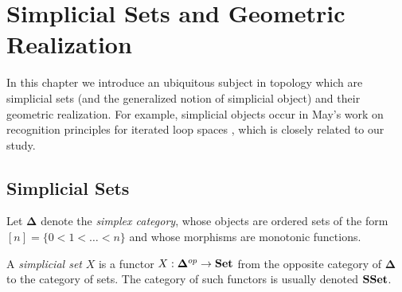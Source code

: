 \documentclass[TFM.tex]{subfiles}
\begin{document}
\chapter{Simplicial Sets and Geometric Realization}\label{ch2}




In this chapter we introduce an ubiquitous subject in topology which are simplicial sets (and the generalized notion of simplicial object) and their geometric realization. For example, simplicial objects occur in May's work on recognition principles for iterated loop spaces \cite{simplicial}, which is closely related to our study.

%
%




\section{Simplicial Sets}

Let $\mathbf{\Delta}$ denote the \emph{simplex category}, whose objects are ordered sets of the form $[n]=\{0<1<\dots< n\}$ and whose morphisms are monotonic functions. 

\begin{defi}
A \emph{simplicial set} $X$ is a functor $X:\mathbf{\Delta}^{op}\to\mathrm{\mathbf{Set}}$ from the opposite category of $\mathbf{\Delta}$ to the category of sets. The category of such functors is usually denoted $\mathrm{\mathbf{SSet}}$. 
\end{defi}
\end{document}

